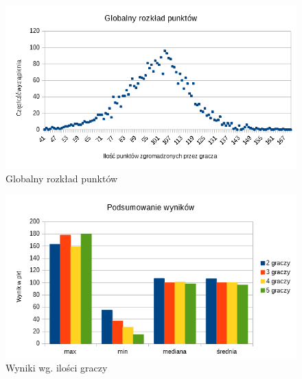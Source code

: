 \documentclass[12pt, oneside]{report}
\begin{document}
\begin{figure}[h]
	\includegraphics{NNWykrespunktowglobal.png}
	\caption{Globalny rozkład punktów}
	\label{figure:global_points_nn}
\end{figure}

\begin{figure}[h]
	\includegraphics{NNWynikWPkt.png}
	\caption{Wyniki wg. ilości graczy}
	\label{figure:min_max_nn}
\end{figure}
\end{document}
